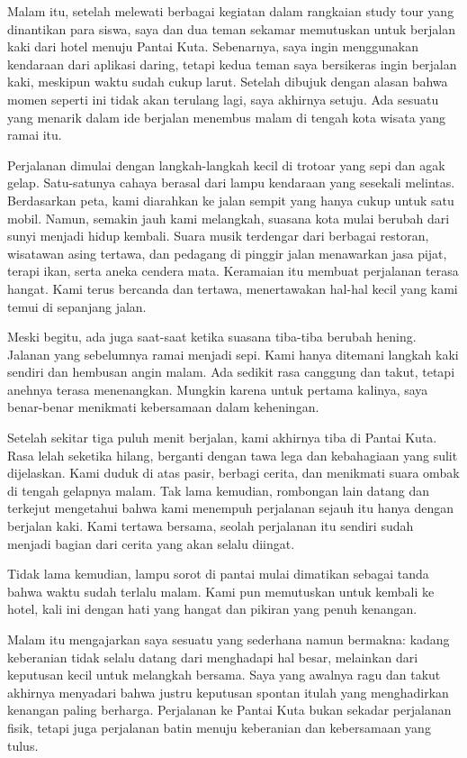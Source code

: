 \documentclass[
  letterpaper,
  DIV=11,
  numbers=noendperiod]{scrreprt}
\begin{document}
Malam itu, setelah melewati berbagai kegiatan dalam rangkaian study tour
yang dinantikan para siswa, saya dan dua teman sekamar memutuskan untuk
berjalan kaki dari hotel menuju Pantai Kuta. Sebenarnya, saya ingin
menggunakan kendaraan dari aplikasi daring, tetapi kedua teman saya
bersikeras ingin berjalan kaki, meskipun waktu sudah cukup larut.
Setelah dibujuk dengan alasan bahwa momen seperti ini tidak akan
terulang lagi, saya akhirnya setuju. Ada sesuatu yang menarik dalam ide
berjalan menembus malam di tengah kota wisata yang ramai itu.

Perjalanan dimulai dengan langkah-langkah kecil di trotoar yang sepi dan
agak gelap. Satu-satunya cahaya berasal dari lampu kendaraan yang
sesekali melintas. Berdasarkan peta, kami diarahkan ke jalan sempit yang
hanya cukup untuk satu mobil. Namun, semakin jauh kami melangkah,
suasana kota mulai berubah dari sunyi menjadi hidup kembali. Suara musik
terdengar dari berbagai restoran, wisatawan asing tertawa, dan pedagang
di pinggir jalan menawarkan jasa pijat, terapi ikan, serta aneka cendera
mata. Keramaian itu membuat perjalanan terasa hangat. Kami terus
bercanda dan tertawa, menertawakan hal-hal kecil yang kami temui di
sepanjang jalan.

Meski begitu, ada juga saat-saat ketika suasana tiba-tiba berubah
hening. Jalanan yang sebelumnya ramai menjadi sepi. Kami hanya ditemani
langkah kaki sendiri dan hembusan angin malam. Ada sedikit rasa canggung
dan takut, tetapi anehnya terasa menenangkan. Mungkin karena untuk
pertama kalinya, saya benar-benar menikmati kebersamaan dalam
keheningan.

Setelah sekitar tiga puluh menit berjalan, kami akhirnya tiba di Pantai
Kuta. Rasa lelah seketika hilang, berganti dengan tawa lega dan
kebahagiaan yang sulit dijelaskan. Kami duduk di atas pasir, berbagi
cerita, dan menikmati suara ombak di tengah gelapnya malam. Tak lama
kemudian, rombongan lain datang dan terkejut mengetahui bahwa kami
menempuh perjalanan sejauh itu hanya dengan berjalan kaki. Kami tertawa
bersama, seolah perjalanan itu sendiri sudah menjadi bagian dari cerita
yang akan selalu diingat.

Tidak lama kemudian, lampu sorot di pantai mulai dimatikan sebagai tanda
bahwa waktu sudah terlalu malam. Kami pun memutuskan untuk kembali ke
hotel, kali ini dengan hati yang hangat dan pikiran yang penuh kenangan.

Malam itu mengajarkan saya sesuatu yang sederhana namun bermakna: kadang
keberanian tidak selalu datang dari menghadapi hal besar, melainkan dari
keputusan kecil untuk melangkah bersama. Saya yang awalnya ragu dan
takut akhirnya menyadari bahwa justru keputusan spontan itulah yang
menghadirkan kenangan paling berharga. Perjalanan ke Pantai Kuta bukan
sekadar perjalanan fisik, tetapi juga perjalanan batin menuju keberanian
dan kebersamaan yang tulus.
\end{document}
